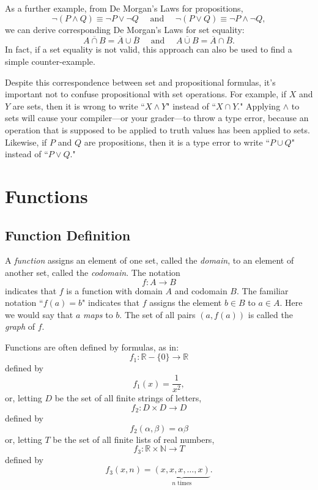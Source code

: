 \documentclass[11pt,oneside]{book}
\theoremstyle{definition}
\begin{document}
As a further example, from De Morgan's Laws for propositions,
\[ \lnot (P \land Q) \equiv \lnot P \lor \lnot Q \quad\text{ and }\quad \lnot (P \lor Q) \equiv \lnot P \land \lnot Q, \]
we can derive corresponding De Morgan's Laws for set equality:
\[ \overline{A \cap B} = \overline{A} \cup \overline{B} \quad\text{ and }\quad\overline{A \cup B} = \overline{A} \cap \overline{B}. \]
In fact, if a set equality is not valid, this approach can also be used to find a simple counter-example.

Despite this correspondence between set and propositional formulas, it's important not to confuse propositional with set operations.
For example, if $X$ and $Y$ are sets, then it is wrong to write ``$X \land Y$" instead of ``$X \cap Y$."
Applying $\land$ to sets will cause your compiler---or your grader---to throw a type error, because an operation that is supposed to be applied to truth values has been applied to sets.
Likewise, if $P$ and $Q$ are propositions, then it is a type error to write ``$P \cup Q$" instead of ``$P \lor Q$."


\section{Functions}
\subsection{Function Definition}
A \emph{function} assigns an element of one set, called the \emph{domain}, to an element of another set, called the \emph{codomain}.
The notation
\[ f: A \to B \]
indicates that $f$ is a function with domain $A$ and codomain $B$.
The familiar notation ``$f(a) = b$" indicates that $f$ assigns the element $b \in B$ to $a \in A$.
Here we would say that $a$ \emph{maps} to $b$.
The set of all pairs $(a, f(a))$ is called the \emph{graph} of $f$.

Functions are often defined by formulas, as in:
\[ f_{1}: \mathbb{R} - \{ 0 \} \to \mathbb{R} \]
defined by
\[ f_{1}(x) = \frac{1}{x^{2}}, \]
or, letting $D$ be the set of all finite strings of letters,
\[ f_{2} : D \times D \to D \]
defined by
\[ f_{2}(\alpha, \beta) = \alpha\beta \]
or, letting $T$ be the set of all finite lists of real numbers,
\[ f_{3}: \mathbb{R} \times \mathbb{N} \to T \]
defined by
\[ f_{3}(x, n) = \underbrace{(x, x, x, \dots, x)}_{n \text{ times}}. \]
\end{document}

